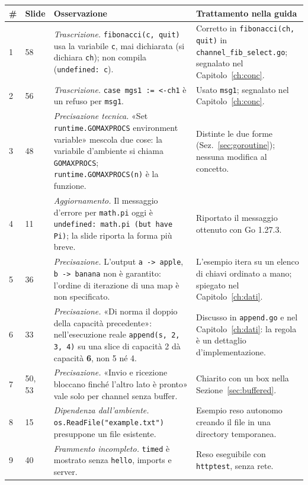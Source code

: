 \documentclass[11pt,a4paper]{report}
\newcommand{\cod}[1]{\texttt{#1}}
\begin{document}
\begin{center}
\footnotesize
\renewcommand{\arraystretch}{1.2}
\begin{longtable}{@{}L{0.5cm}L{1.2cm}L{5.5cm}L{6.4cm}@{}}
\toprule
\textbf{\#} & \textbf{Slide} & \textbf{Osservazione} & \textbf{Trattamento nella guida}\\
\midrule
{} & 58 & \emph{Trascrizione.} \cod{fibonacci(c, quit)} usa la variabile \cod{c}, mai dichiarata (si dichiara \cod{ch}); non compila (\texttt{undefined: c}). &
Corretto in \cod{fibonacci(ch, quit)} in \texttt{channel\_fib\_select.go}; segnalato nel Capitolo~\ref{ch:conc}.\\
2 & 56 & \emph{Trascrizione.} \cod{case mgs1 := <-ch1} è un refuso per \cod{msg1}. &
Usato \cod{msg1}; segnalato nel Capitolo~\ref{ch:conc}.\\
3 & 48 & \emph{Precisazione tecnica.} «Set \cod{runtime.GOMAXPROCS} environment variable» mescola due cose: la variabile d'ambiente si chiama \cod{GOMAXPROCS}; \cod{runtime.GOMAXPROCS(n)} è la funzione. &
Distinte le due forme (Sez.~\ref{sec:goroutine}); nessuna modifica al concetto.\\
4 & 11 & \emph{Aggiornamento.} Il messaggio d'errore per \cod{math.pi} oggi è \texttt{undefined: math.pi (but have Pi)}; la slide riporta la forma più breve. &
Riportato il messaggio ottenuto con Go 1.27.3.\\
5 & 36 & \emph{Precisazione.} L'output \cod{a -> apple}, \cod{b -> banana} non è garantito: l'ordine di iterazione di una map è non specificato. &
L'esempio itera su un elenco di chiavi ordinato a mano; spiegato nel Capitolo~\ref{ch:dati}.\\
6 & 33 & \emph{Precisazione.} «Di norma il doppio della capacità precedente»: nell'esecuzione reale \cod{append(s, 2, 3, 4)} su una slice di capacità 2 dà capacità \textbf{6}, non 5 né 4. &
Discusso in \texttt{append.go} e nel Capitolo~\ref{ch:dati}: la regola è un dettaglio d'implementazione.\\
7 & 50, 53 & \emph{Precisazione.} «Invio e ricezione bloccano finché l'altro lato è pronto» vale solo per channel senza buffer. &
Chiarito con un box nella Sezione~\ref{sec:buffered}.\\
8 & 15 & \emph{Dipendenza dall'ambiente.} \cod{os.ReadFile("example.txt")} presuppone un file esistente. &
Esempio reso autonomo creando il file in una directory temporanea.\\
9 & 40 & \emph{Frammento incompleto.} \cod{timed} è mostrato senza \cod{hello}, imports e server. &
Reso eseguibile con \cod{httptest}, senza rete.\\

\end{longtable}
\end{center}
\end{document}
